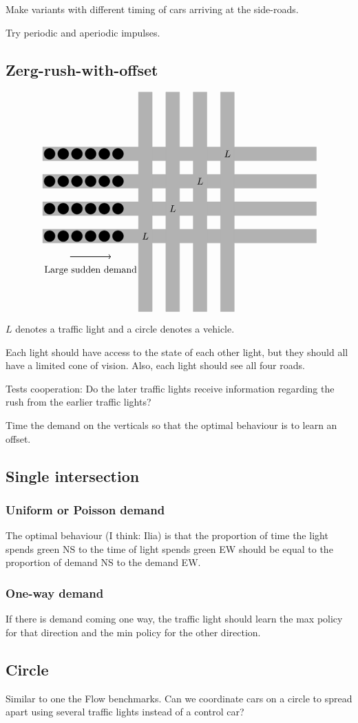 \documentclass{article}
\begin{document}
Make variants with different timing of cars arriving at the side-roads.

Try periodic and aperiodic impulses.

\subsection{Zerg-rush-with-offset}
\[\begin{tikzpicture}[scale=0.5]
    \foreach \y in {-3,-1,1,3} {
        \draw[color=\road_color, fill=\road_color]
            (-10,\y) -- (10,\y) -- (10,\y+1) -- (-10,\y+1) -- (-10,\y);
    }
    \foreach \x in {-3,-1,1,3} {
        \draw[color=\road_color, fill=\road_color]
            (\x,-8) -- (\x,8) -- (\x+1,8) -- (\x+1,-8) -- (\x,-8);
    }
    
    \node at (3.5,3.5) {$L$};
    \node at (1.5,1.5) {$L$};
    \node at (-0.5,-0.5) {$L$};
    \node at (-2.5,-2.5) {$L$};
    
    \foreach \y in {-2.5, -0.5, 1.5, 3.5} {
        \foreach \x in {-9.5, -8.5,..., -4.5} {
            \draw[fill=\car_color] (\x,\y) circle(0.4);
        }
    }
    
    \draw[->, thick] (-8, -4) -- (-5, -4);
    \node at (-6.5, -5) {Large sudden demand};
\end{tikzpicture}\]

$L$ denotes a traffic light and a circle denotes a vehicle.

Each light should have access to the state of each other light, but they should all have a limited cone of vision. Also, each light should see all four roads.

Tests cooperation: Do the later traffic lights receive information regarding the rush from the earlier traffic lights?

Time the demand on the verticals so that the optimal behaviour is to learn an offset.

\subsection{Single intersection}
\subsubsection{Uniform or Poisson demand} The optimal behaviour (I think: Ilia) is that the proportion of time the light spends green NS to the time of light spends green EW should be equal to the proportion of demand NS to the demand EW.

\subsubsection{One-way demand}
If there is demand coming one way, the traffic light should learn the max policy for that direction and the min policy for the other direction.

\subsection{Circle}
Similar to one the Flow benchmarks. Can we coordinate cars on a circle to spread apart using several traffic lights instead of a control car?
\end{document}
